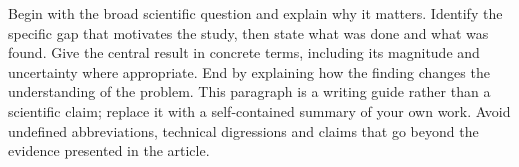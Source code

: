 Begin with the broad scientific question and explain why it matters. Identify the
specific gap that motivates the study, then state what was done and what was
found. Give the central result in concrete terms, including its magnitude and
uncertainty where appropriate. End by explaining how the finding changes the
understanding of the problem. This paragraph is a writing guide rather than a
scientific claim; replace it with a self-contained summary of your own work.
Avoid undefined abbreviations, technical digressions and claims that go beyond
the evidence presented in the article.
